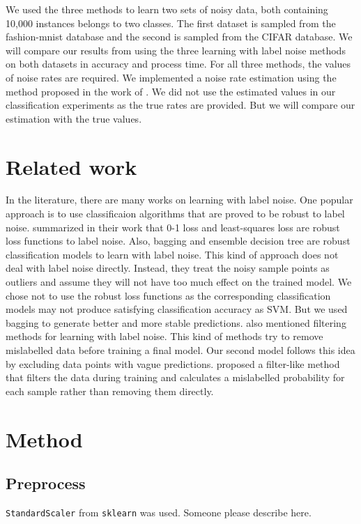 \documentclass{article} %
\begin{document}
We used the three methods to learn two sets of noisy data, both containing 10,000 instances belongs to two classes. The first dataset is sampled from the fashion-mnist database and the second is sampled from the CIFAR database. We will compare our results from using the three learning with label noise methods on both datasets in accuracy and process time. For all three methods, the values of noise rates are required. We implemented a noise rate estimation using the method proposed in the work of \citet{liu2016classification}. We did not use the estimated values in our classification experiments as the true rates are provided. But we will compare our estimation with the true values.

\section{Related work}
In the literature, there are many works on learning with label noise. One popular approach is to use classificaion algorithms that are proved to be robust to label noise. \cite{frenay2014classification} summarized in their work that 0-1 loss and least-squares loss are robust loss functions to label noise. Also, bagging and ensemble decision tree are robust classification models to learn with label noise. This kind of approach does not deal with label noise directly. Instead, they treat the noisy sample points as outliers and assume they will not have too much effect on the trained model. We chose not to use the robust loss functions as the corresponding classification models may not produce satisfying classification accuracy as SVM. But we used bagging to generate better and more stable predictions. \cite{frenay2014classification} also mentioned filtering methods for learning with label noise. This kind of methods try to remove mislabelled data before training a final model. Our second model follows this idea by excluding data points with vague predictions. \cite{yang2018adasampling} proposed a filter-like method that filters the data during training and calculates a mislabelled probability for each sample rather than removing them directly. 

\section{Method}
\subsection{Preprocess}
\texttt{StandardScaler} from \texttt{sklearn} was used. Someone please describe here.
\end{document}
